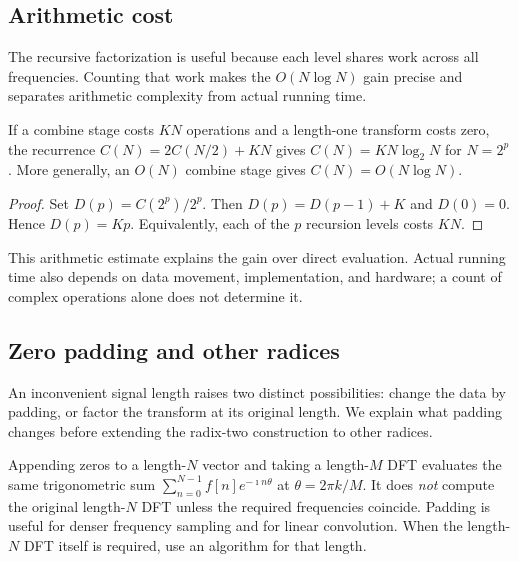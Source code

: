 \subsection{Arithmetic cost}
\label{sect2-analyze-cost-fft}

The recursive factorization is useful because each level shares work across
all frequencies. Counting that work makes the $O(N\log N)$ gain precise and
separates arithmetic complexity from actual running time.

\begin{prop}
If a combine stage costs $KN$ operations and a length-one transform costs
zero, the recurrence $C(N)=2C(N/2)+KN$ gives $C(N)=KN\log_2N$ for $N=2^p$.
More generally, an $O(N)$ combine stage gives $C(N)=O(N\log N)$.
\end{prop}
\begin{proof}
Set $D(p)=C(2^p)/2^p$. Then $D(p)=D(p-1)+K$ and $D(0)=0$.
Hence $D(p)=Kp$. Equivalently, each of the $p$ recursion levels costs $KN$.
\end{proof}
This arithmetic estimate explains the gain over direct evaluation.
Actual running time also depends on data movement, implementation, and
hardware; a count of complex operations alone does not determine it.

\subsection{Zero padding and other radices}
\label{sect2-variations-fft}

An inconvenient signal length raises two distinct possibilities: change the
data by padding, or factor the transform at its original length. We explain
what padding changes before extending the radix-two construction to other
radices.

\begin{rem}
Appending zeros to a length-$N$ vector and taking a length-$M$ DFT evaluates
the same trigonometric sum $\sum_{n=0}^{N-1}f[n]e^{-\imath n\theta}$ at
$\theta=2\pi k/M$. It does \emph{not} compute the original length-$N$ DFT
unless the required frequencies coincide. Padding is useful for denser
frequency sampling and for linear convolution. When the length-$N$ DFT
itself is required, use an algorithm for that length.
\end{rem}


